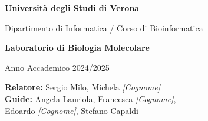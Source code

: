     \vspace*{2cm}
    
    {\Large\bfseries Università degli Studi di Verona \par}
    \vspace{0.5cm}
    {\large Dipartimento di Informatica / Corso di Bioinformatica \par}
    
    \vspace{3cm}
    
    {\Huge\bfseries Laboratorio di Biologia Molecolare\par}
    \vspace{0.5cm}
    {\LARGE Anno Accademico 2024/2025\par}
    
    \vfill
    
    \begin{flushleft}
    \textbf{Relatore:} Sergio Milo, Michela \textit{[Cognome]}\\
    \textbf{Guide:} Angela Lauriola, Francesca \textit{[Cognome]},\\
     Edoardo \textit{[Cognome]}, Stefano Capaldi
    \end{flushleft}
    
    \vspace{2cm}
    
    \begin{flushleft}
    \end{flushleft}
    \newpage
    

